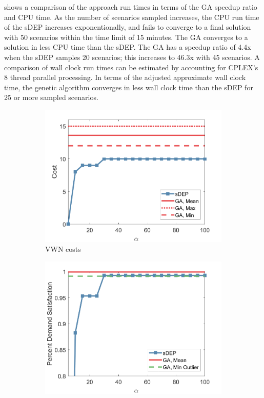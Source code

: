 \documentclass[conference]{IEEEtran}
\begin{document}
 shows a comparison of the approach run times in terms of the GA speedup ratio and CPU time.  As the number of scenarios sampled increases, the CPU run time of the sDEP increases exponentionally, and fails to converge to a final solution with 50 scenarios within the time limit of 15 minutes.  The GA converges to a solution in less CPU time than the sDEP.  The GA has a speedup ratio of 4.4x when the sDEP samples 20 scenarios; this increases to 46.3x with 45 scenarios.  A comparison of wall clock run times can be estimated by accounting for CPLEX's 8 thread parallel processing.  In terms of the adjusted approximate wall clock time, the genetic algorithm converges in less wall clock time than the sDEP for 25 or more sampled scenarios.

\begin{figure}[t]
\centering
\begin{subfigure}{.3\textwidth}
	\centering
	\includegraphics[width=1\linewidth]{Figures/ComparisonCost}
	\caption{VWN costs}
	\label{fig:VWNCompCost}
\end{subfigure}
\hspace{0.3cm}
\begin{subfigure}{.3\textwidth}
	\centering
	\includegraphics[width=1\linewidth]{Figures/ComparisonSatisfaction}

\end{subfigure}
\end{figure}
\end{document}
